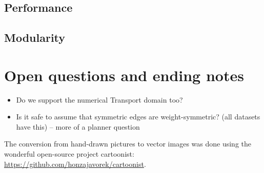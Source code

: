 \documentclass[10pt,a4paper,oneside]{article}
\begin{document}
\subsection{Performance}
\subsection{Modularity}















\section{Open questions and ending notes}

\begin{itemize}
    \item Do we support the numerical Transport domain too?
    \item Is it safe to assume that symmetric edges are weight-symmetric? (all datasets have this) -- more of a planner question
\end{itemize}

The conversion from hand-drawn pictures to vector images was done using the wonderful
open-source project cartoonist: \url{https://github.com/honzajavorek/cartoonist}.

{
\footnotesize %

}
\end{document}
